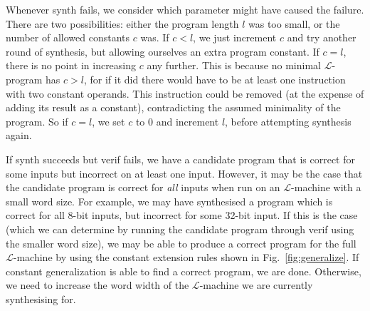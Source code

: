 Whenever {\sc synth} fails, we consider which parameter might have caused the
failure.  There are two possibilities: either the program length $l$ was too small,
or the number of allowed constants $c$ was.  If $c < l$, we just increment $c$ and
try another round of synthesis, but allowing ourselves an extra program constant.
If $c = l$, there is no point in increasing $c$ any further.  This is because
no minimal $\mathcal{L}$-program has $c > l$, for if it did there would
have to be at least one instruction with two constant operands.  This
instruction could be removed (at the expense of adding its result as
a constant), contradicting the assumed minimality of the program.  So
if $c = l$, we set $c$ to 0 and increment $l$, before attempting
synthesis again.

If {\sc synth} succeeds but {\sc verif} fails, we have a candidate
program that is correct for some inputs but incorrect on at least
one input.  However, it may be the case that the candidate program
is correct for \emph{all} inputs when run on an $\mathcal{L}$-machine
with a small word size.  For example, we may have synthesised a
program which is correct for all 8-bit inputs, but incorrect for
some 32-bit input.  If this is the case (which we can determine
by running the candidate program through {\sc verif} using the smaller
word size), we may be able to produce a correct program for
the full $\mathcal{L}$-machine by using the constant extension rules
shown in Fig.~\ref{fig:generalize}.  If constant generalization
is able to find a correct program, we are done.  Otherwise,
we need to increase the word width of the $\mathcal{L}$-machine
we are currently synthesising for.

